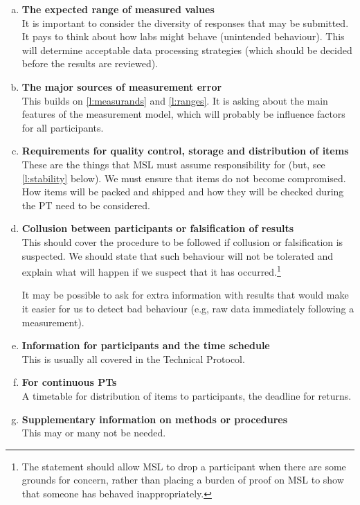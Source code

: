\begin{enumerate}[a)]
\item	\textbf{The expected range of measured values} \\ \label{l:ranges}%
It is important to consider the diversity of responses that may be submitted. It pays to think about how labs might behave (unintended behaviour). This will determine acceptable data processing strategies (which should be decided before the results are reviewed).

\item	\textbf{The major sources of measurement error} \\
This builds on \ref{l:measurands} and \ref{l:ranges}. It is asking about the main features of the measurement model, which will probably be influence factors for all participants.


\item	\textbf{Requirements for quality control, storage and distribution of items} \\
These are the things that MSL must assume responsibility for (but, see \ref{l:stability} below). We must ensure that items do not become compromised. How items will be packed and shipped and how they will be checked during the PT need to be considered.


\item	\textbf{Collusion between participants or falsification of results}  \\
This should cover the procedure to be followed if collusion or falsification is suspected. We should state that such behaviour will not be tolerated and explain what will happen if we suspect that it has occurred.\footnote{The statement should allow MSL to drop a participant when there are some grounds for concern, rather than placing a burden of proof on MSL to show that someone has behaved inappropriately.} 
 
It may be possible to ask for extra information with results that would make it easier for us to detect bad behaviour (e.g, raw data immediately following a measurement).


\item	\textbf{Information for participants and the time schedule}  \\
This is usually all covered in the Technical Protocol.

\item	\textbf{For continuous PTs} \\ 
A timetable for distribution of items to participants, the deadline for returns.

\item	\textbf{Supplementary information on methods or procedures} \\
This may or many not be needed.


\end{enumerate}
